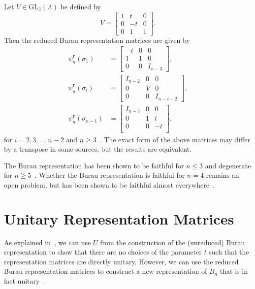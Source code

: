 Let $V\in\textrm{GL}_{3}(\Lambda)$ be defined by
\begin{equation}
    V = \begin{bmatrix}
        1 & t & 0 \\
        0 & -t & 0 \\
        0 & 1 & 1
    \end{bmatrix}.
\end{equation}
Then the reduced Burau representation matrices are given by
\begin{align}
    \psi_n^\textbf{r}(\sigma_1) &= \begin{bmatrix}
        -t & 0 & 0 \\
        1 & 1 & 0 \\
        0 & 0 & I_{n-3}
    \end{bmatrix}, \\
    \psi_n^\textbf{r}(\sigma_i) &= \begin{bmatrix}
        I_{n-2} & 0 & 0 \\
        0 & V & 0 \\
        0 & 0 & I_{n-i-2}
    \end{bmatrix}, \\
    \psi_n^\textbf{r}(\sigma_{n-1}) &= \begin{bmatrix}
        I_{n-3} & 0 & 0 \\
        0 & 1 & t \\
        0 & 0 & -t \\
    \end{bmatrix},
\end{align}
for $i=2,3,\dots,n-2$ and $n\geq 3$~\cite{Kassel2008}. The exact form of the above matrices may differ by a transpose in some sources, but the results are equivalent.

The Burau representation has been shown to be faithful for $n\leq 3$ and degenerate for $n \geq 5$~\cite{Kassel2008}. Whether the Burau representation is faithful for $n=4$ remains an open problem, but has been shown to be faithful almost everywhere~\cite{Datta2022}.

\section{Unitary Representation Matrices}
As explained in~\cite{Delaney2016}, we can use $U$ from the construction of the (unreduced) Burau representation to show that there are no choices of the parameter $t$ such that the representation matrices are directly unitary. However, we can use the reduced Burau representation matrices to construct a new representation of $B_n$ that is in fact unitary~\cite{Delaney2016,Squier1984}.

